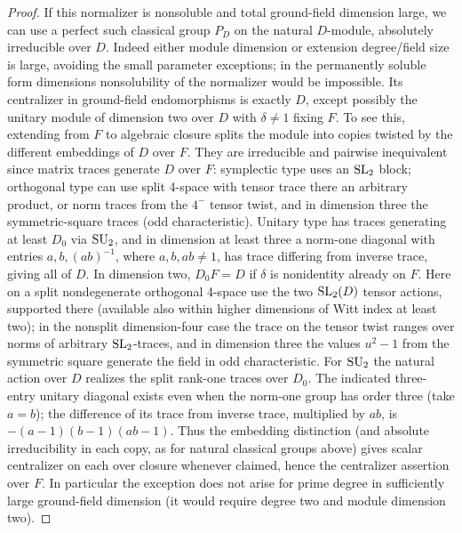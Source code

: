 \begin{proof}
If this normalizer is nonsoluble and total ground-field dimension large, we can use a perfect such classical group \(P_D\) on the natural \(D\)-module, absolutely irreducible over \(D\). Indeed either module dimension or extension degree/field size is large, avoiding the small parameter exceptions; in the permanently soluble form dimensions nonsolubility of the normalizer would be impossible. Its centralizer in ground-field endomorphisms is exactly \(D\), except possibly the unitary module of dimension two over \(D\) with \(\delta\ne1\) fixing \(F\). To see this, extending from \(F\) to algebraic closure splits the module into copies twisted by the different embeddings of \(D\) over \(F\). They are irreducible and pairwise inequivalent since matrix traces generate \(D\) over \(F\): symplectic type uses an \({\rm SL}_2\) block; orthogonal type can use split 4-space with tensor trace there an arbitrary product, or norm traces from the \(4^-\) tensor twist, and in dimension three the symmetric-square traces (odd characteristic). Unitary type has traces generating at least \(D_0\) via \({\rm SU}_2\), and in dimension at least three a norm-one diagonal with entries \(a,b,(ab)^{-1}\), where \(a,b,ab\ne1\), has trace differing from inverse trace, giving all of \(D\). In dimension two, \(D_0F=D\) if \(\delta\) is nonidentity already on \(F\). Here on a split nondegenerate orthogonal 4-space use the two \({\rm SL}_2(D)\) tensor actions, supported there (available also within higher dimensions of Witt index at least two); in the nonsplit dimension-four case the trace on the tensor twist ranges over norms of arbitrary \({\rm SL}_2\)-traces, and in dimension three the values \(u^2-1\) from the symmetric square generate the field in odd characteristic. For \({\rm SU}_2\) the natural action over \(D\) realizes the split rank-one traces over \(D_0\). The indicated three-entry unitary diagonal exists even when the norm-one group has order three (take \(a=b\)); the difference of its trace from inverse trace, multiplied by \(ab\), is \(-(a-1)(b-1)(ab-1)\). Thus the embedding distinction (and absolute irreducibility in each copy, as for natural classical groups above) gives scalar centralizer on each over closure whenever claimed, hence the centralizer assertion over \(F\). In particular the exception does not arise for prime degree in sufficiently large ground-field dimension (it would require degree two and module dimension two).
\end{proof}

